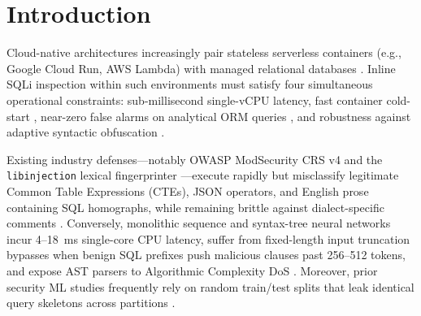 \documentclass[preprint,12pt]{elsarticle}
\begin{document}
\section{Introduction}
Cloud-native architectures increasingly pair stateless serverless containers (e.g., Google Cloud Run, AWS Lambda) with managed relational databases \cite{jonas2019serverless,baldini2017serverless,eismann2021serverless_cost}. Inline SQLi inspection within such environments must satisfy four simultaneous operational constraints: sub-millisecond single-vCPU latency, fast container cold-start \cite{lin2020faas_coldstart}, near-zero false alarms on analytical ORM queries \cite{alazab2022imbalanced,saito2015prauc}, and robustness against adaptive syntactic obfuscation \cite{halfond2006,demetrio2020wafamole,demetrio2021adv_waf}.

Existing industry defenses—notably OWASP ModSecurity CRS v4 \cite{owaspcrs2024} and the \texttt{libinjection} lexical fingerprinter \cite{galbreath2013libinj}—execute rapidly but misclassify legitimate Common Table Expressions (CTEs), JSON operators, and English prose containing SQL homographs, while remaining brittle against dialect-specific comments \cite{appelt2018mlwaf,wang2024obfuscated_sql}. Conversely, monolithic sequence and syntax-tree neural networks \cite{fang2018bilstm,zhang2020cnn_bilstm,tang2020sql_ast,li2021ast_gnn,guan2023bert_sqli} incur 4--18~ms single-core CPU latency, suffer from fixed-length input truncation bypasses when benign SQL prefixes push malicious clauses past 256--512 tokens, and expose AST parsers to Algorithmic Complexity DoS \cite{crosby2003algodos,davis2018redos}. Moreover, prior security ML studies frequently rely on random train/test splits that leak identical query skeletons across partitions \cite{pendlebury2019tesseract,arp2022dos_donts}.
\end{document}
